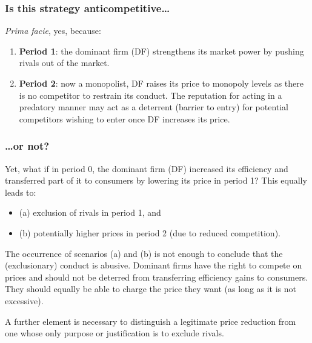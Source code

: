         \subsubsection{Is this strategy anticompetitive…}

            \textit{Prima facie}, yes, because:

            \begin{enumerate}
                \item \textbf{Period 1}: the dominant firm (DF) strengthens its market power by pushing rivals out of the market.
                \item \textbf{Period 2}: now a monopolist, DF raises its price to monopoly levels as there is no competitor to restrain its conduct. The reputation for acting in a predatory manner may act as a deterrent (barrier to entry) for potential competitors wishing to enter once DF increases its price.
            \end{enumerate}


        \subsubsection{…or not?}

            Yet, what if in period 0, the dominant firm (DF) increased its efficiency and transferred part of it to consumers by lowering its price in period 1? This equally leads to:
    
            \begin{itemize}
                \item (a) exclusion of rivals in period 1, and
                \item (b) potentially higher prices in period 2 (due to reduced competition).
            \end{itemize}
            
            The occurrence of scenarios (a) and (b) is not enough to conclude that the (exclusionary) conduct is abusive. Dominant firms have the right to compete on prices and should not be deterred from transferring efficiency gains to consumers. They should equally be able to charge the price they want (as long as it is not excessive).
            
            A further element is necessary to distinguish a legitimate price reduction from one whose only purpose or justification is to exclude rivals.

